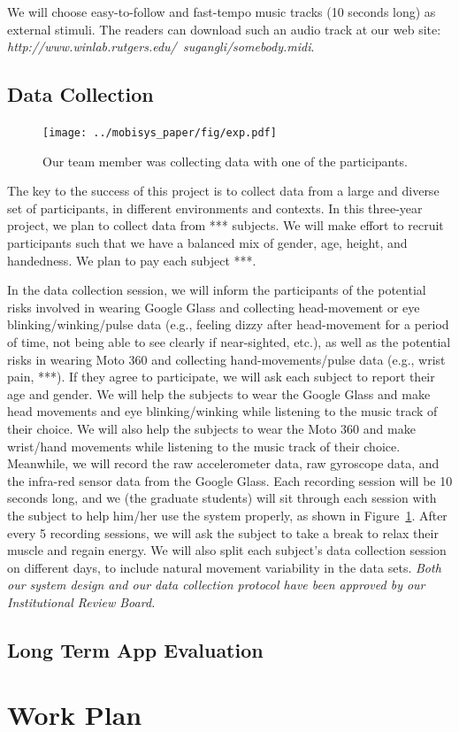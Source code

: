 We will choose easy-to-follow and fast-tempo music tracks (10 seconds long) as external stimuli. The readers can download such an audio track at our web site: \emph{http://www.winlab.rutgers.edu/~sugangli/somebody.midi}. 

\subsection{Data Collection}\label{subsec:user}
\begin{figure}\centering
\texttt{[image: ../mobisys\_paper/fig/exp.pdf]}
\caption{Our team member was collecting data with one of the participants. \label{fig:exp}}
\end{figure} 

The key to the success of this project is to collect data from a large and diverse set of participants, in different environments and contexts.  In this three-year project, we plan to collect data from *** subjects. We will make effort to recruit participants such that we have a balanced mix of gender, age, height, and handedness. We plan to pay each subject ***. 
 
In the data collection session, we will inform the participants of the potential risks involved in wearing Google Glass and collecting head-movement or eye blinking/winking/pulse data (e.g., feeling dizzy after head-movement for a period of time, not being able to see clearly if near-sighted, etc.), as well as the potential risks in wearing Moto 360 and collecting hand-movements/pulse data (e.g., wrist pain, ***). If they agree to participate, we will ask each subject to report their age and gender. We will help the subjects to wear the Google Glass and make head movements and eye blinking/winking while listening to the music track of their choice. We will also help the subjects to wear the Moto 360 and make wrist/hand movements while listening to the music track of their choice. Meanwhile, we will record the raw accelerometer data, raw gyroscope data, and the infra-red sensor data from the Google Glass.  Each recording session will be 10 seconds long, and we (the graduate students) will sit through each session with the subject to help him/her use the system properly, as shown in Figure~\ref{fig:exp}. After every 5 recording sessions, we will ask the subject to take a break to relax their muscle and regain energy. We will also split each subject's data collection session on different days, to include natural movement variability in the data sets. \emph{Both our system design and our data collection protocol have been approved by our Institutional Review Board.}


\subsection{Long Term App Evaluation}

\section{Work Plan}\label{subsec:plan}

